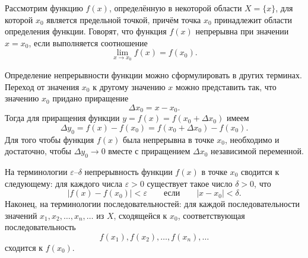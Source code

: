 \begin{rusblock}
Рассмотрим функцию $f(x)$, определённую в некоторой области $X=\{x\}$, для которой $x_0$ является предельной точкой, причём точка $x_0$ принадлежит области определения функции. Говорят, что функция $f(x)$ непрерывна при значении $x=x_0$, если выполняется соотношение
\[
\lim_{x\to x_0}f(x)=f(x_0).
\]

Определение непрерывности функции можно сформулировать в других терминах. Переход от значения $x_0$ к другому значению $x$ можно представить так, что значению $x_0$ придано приращение
\[
\Delta x_0=x-x_0.
\]
Тогда для приращения функции $y=f(x)=f(x_0+\Delta x_0)$ имеем
\[
\Delta y_0=f(x)-f(x_0)=f(x_0+\Delta x_0)-f(x_0).
\]
Для того чтобы функция $f(x)$ была непрерывна в точке $x_0$, необходимо и достаточно, чтобы $\Delta y_0\to0$ вместе с приращением $\Delta x_0$ независимой переменной.

На терминологии $\varepsilon$--$\delta$ непрерывность функции $f(x)$ в точке $x_0$ сводится к следующему: для каждого числа $\varepsilon>0$ существует такое число $\delta>0$, что
\[
|f(x)-f(x_0)|<\varepsilon\qquad\text{если}\qquad |x-x_0|<\delta.
\]
Наконец, на терминологии последовательностей: для каждой последовательности значений $x_1,x_2,\ldots,x_n,\ldots$ из $X$, сходящейся к $x_0$, соответствующая последовательность
\[
f(x_1),f(x_2),\ldots,f(x_n),\ldots
\]
сходится к $f(x_0)$.
\end{rusblock}

